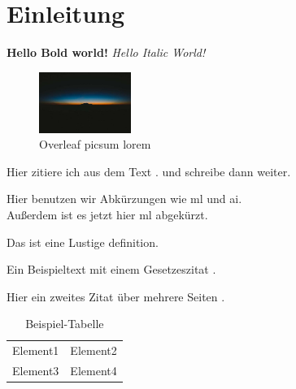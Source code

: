 \documentclass[../main.tex]{subfiles}
\begin{document}
\section{Einleitung}

\textbf{Hello Bold world!} %
\textit{Hello Italic World!} %

\begin{figure}[h]
    \centering
    \includegraphics[width=3cm]{images/picsum lorem.jpg} %
    \caption{Overleaf picsum lorem} %
    \label{fig:picsum_lorem} %
\end{figure}

Hier zitiere ich aus dem Text \autocite[10]{smith2018}. und schreibe dann weiter.\par %


Hier benutzen wir Abkürzungen wie \gls{ml} und \gls{ai}.\\ %
Außerdem ist es jetzt hier \gls{ml} abgekürzt.\par %


\begin{definition}
Das ist eine Lustige definition.
\end{definition}

Ein Beispieltext mit einem Gesetzeszitat . %

Hier ein zweites Zitat über mehrere Seiten \autocite[15-27]{johnson2020}. %

\medskip

\begin{table}[h]
    \centering
    \begin{tabular}{cc}
        Element1 & Element2\\
        Element3 & Element4\\
    \end{tabular}
    \caption{Beispiel-Tabelle} %
    \label{tab:example_table} %
\end{table}
\end{document}
